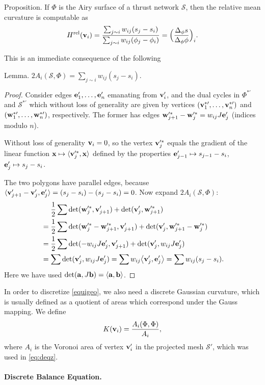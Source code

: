 \documentclass[annual]{acmsiggraph}
\def\<{\mathchoice{\big\langle}{\langle}{\langle}{\langle}}
\def\>{\mathchoice{\big\rangle}{\rangle}{\rangle}{\rangle}}
\def\rel{{\mathord{\text{\rm rel}}}}
\def\SS{{\mathcal S}}
\begin{document}
\proclaim Proposition. 
 If $\Phi$ is the Airy surface of a thrust network $\SS$, then
 the relative mean curvature is computable as 
	$$
		H^\rel(\vw_i) 
	= 
		{\sum_{j\sim i} w_{ij} (s_j-s_i) 
		\over \sum_{j\sim i} w_{ij} (\phi_j-\phi_i) }
	=
		\Big({\Delta_\phi s\over \Delta_\phi \phi}\Big)_i.
	$$

This is an immediate consequence of the following

\proclaim Lemma.
	$
	2A_i(\SS,\Phi) 
	= \sum_{j\sim i} w_{ij} (s_j-s_i).
	$

\begin{proof} Consider edges ${\mathbf e}'_1,\dots,{\mathbf e}'_n$ emanating from 
${\mathbf v}_i'$, and the dual cycles in  $\Phi^{*\prime}$ and $\SS^{*\prime}$
which without loss of generality are given by vertices
$({\mathbf v}^{*\prime}_1,\dots,{\mathbf v}^{*\prime}_n)$ and
$({\mathbf w}^{*\prime}_1,\dots,{\mathbf w}^{*\prime}_n)$, respectively.
The former has edges ${\mathbf w}'^*_{j+1}-{\mathbf w}'^*_j = w_{ij} J{\mathbf e}'_j$ (indices
modulo $n$).

Without loss of generality ${\mathbf v}_i=0$, so the vertex ${\mathbf v}'^*_j$ 
equals the gradient of the linear function $\xw\mapsto \<\vw'^*_j,\xw\>$ 
defined by the properties ${\mathbf e}'_{j-1}\mapsto s_{j-1}-s_i$, ${\mathbf e}'_j\mapsto 
s_j-s_i$.

The two polygons have parallel edges, because 
$\<\vw'_{j+1}-\vw'_j,\ew'_j\>=(s_j-s_i)-(s_j-s_i)=0$. Now expand 
$2A_i(\SS,\Phi)$:
	\begin{align*}
	& \mathrel{\hphantom{=}}
		{1\over 2}\sum
		\det(\ww'^*_j, \vw'_{j+1}) + \det(\vw'_j, \ww'^*_{j+1})
	\\
	&=
		{1\over 2}\sum
		\det(\ww'^*_j-\ww'^*_{j+1}, \vw'_{j+1}) 
		+ \det(\vw'_j, \ww'^*_{j+1}-\ww'^*_j)
		\\
	&= 
		{1\over 2}\sum
		\det( - w_{ij} J\ew'_j, \vw'_{j+1}) 
	 	+ \det(\vw'_j,w_{ij} J\ew'_j)
	\\
	&= 	 \sum \det( \vw'_j, w_{ij} J\ew'_j) 
	=	 \sum	w_{ij} \< \vw'_j, \ew'_j\>
	= 	 \sum  w_{ij} (s_j-s_i).
	\end{align*}
 Here we have used $\det(\aw,J\bw)=\<\aw,\bw\>$.
 \end{proof}


In order to discretize \eqref{equigeo}, we also need a discrete Gaussian 
curvature, which is usually defined as a quotient of areas which 
correspond under the Gauss mapping. We define
	$$
	K({\mathbf v}_i) = {A_i(\Phi,\Phi) \over A_i},
	$$
 where $A_i$ is the Voronoi area of vertex ${\mathbf v}_i'$ in the projected mesh 
$\SS'$, which was used in \eqref{eq:deqz}.

\paragraph{Discrete Balance Equation.}
\end{document}
